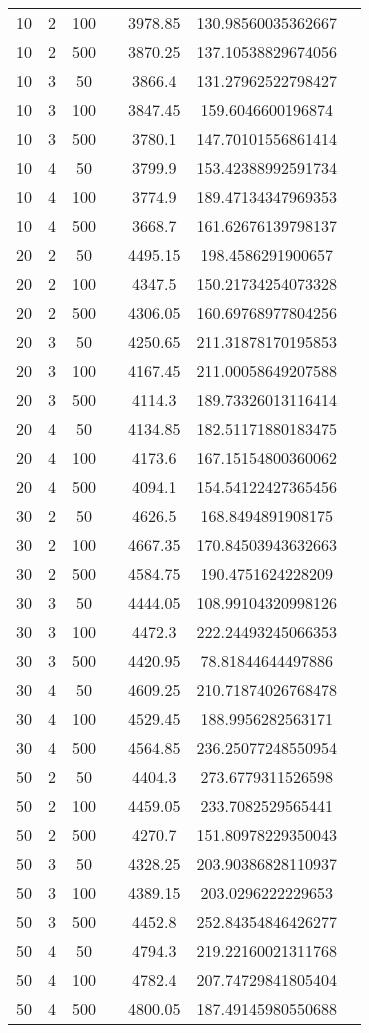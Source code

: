 {\begin{longtabu}{S
S
S
S
S
S[round-mode=places,round-precision=0]
S[round-mode=places,round-precision=0]}
10 & 2 & 100 & & 3978.85 & 130.98560035362667 \\
10 & 2 & 500 & & 3870.25 & 137.10538829674056 \\
10 & 3 & 50 & & 3866.4 & 131.27962522798427 \\
10 & 3 & 100 & & 3847.45 & 159.6046600196874 \\
10 & 3 & 500 & & 3780.1 & 147.70101556861414 \\
10 & 4 & 50 & & 3799.9 & 153.42388992591734 \\
10 & 4 & 100 & & 3774.9 & 189.47134347969353 \\
10 & 4 & 500 & & 3668.7 & 161.62676139798137 \\
20 & 2 & 50 & & 4495.15 & 198.4586291900657 \\
20 & 2 & 100 & & 4347.5 & 150.21734254073328 \\
20 & 2 & 500 & & 4306.05 & 160.69768977804256 \\
20 & 3 & 50 & & 4250.65 & 211.31878170195853 \\
20 & 3 & 100 & & 4167.45 & 211.00058649207588 \\
20 & 3 & 500 & & 4114.3 & 189.73326013116414 \\
20 & 4 & 50 & & 4134.85 & 182.51171880183475 \\
20 & 4 & 100 & & 4173.6 & 167.15154800360062 \\
20 & 4 & 500 & & 4094.1 & 154.54122427365456 \\
30 & 2 & 50 & & 4626.5 & 168.8494891908175 \\
30 & 2 & 100 & & 4667.35 & 170.84503943632663 \\
30 & 2 & 500 & & 4584.75 & 190.4751624228209 \\
30 & 3 & 50 & & 4444.05 & 108.99104320998126 \\
30 & 3 & 100 & & 4472.3 & 222.24493245066353 \\
30 & 3 & 500 & & 4420.95 & 78.81844644497886 \\
30 & 4 & 50 & & 4609.25 & 210.71874026768478 \\
30 & 4 & 100 & & 4529.45 & 188.9956282563171 \\
30 & 4 & 500 & & 4564.85 & 236.25077248550954 \\
50 & 2 & 50 & & 4404.3 & 273.6779311526598 \\
50 & 2 & 100 & & 4459.05 & 233.7082529565441 \\
50 & 2 & 500 & & 4270.7 & 151.80978229350043 \\
50 & 3 & 50 & & 4328.25 & 203.90386828110937 \\
50 & 3 & 100 & & 4389.15 & 203.0296222229653 \\
50 & 3 & 500 & & 4452.8 & 252.84354846426277 \\
50 & 4 & 50 & & 4794.3 & 219.22160021311768 \\
50 & 4 & 100 & & 4782.4 & 207.74729841805404 \\
50 & 4 & 500 & & 4800.05 & 187.49145980550688 \\
\hline
\end{longtabu}

}
